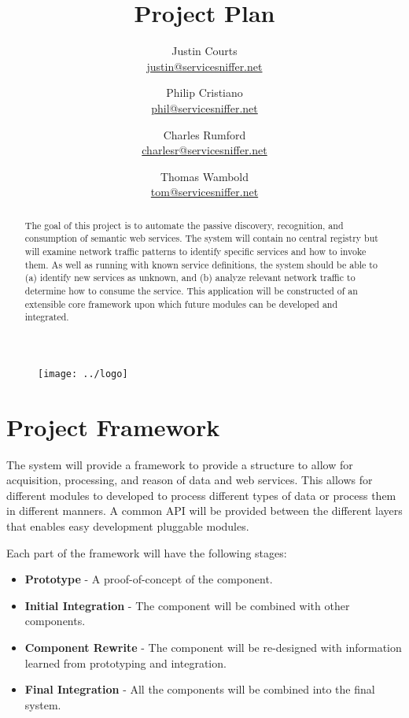 \documentclass{article}
\title{\textbf{Project Plan}}
\author{
    Justin Courts \\\url{justin@servicesniffer.net}
    \and Philip Cristiano \\\url{phil@servicesniffer.net}
    \and Charles Rumford \\\url{charlesr@servicesniffer.net}
    \and Thomas Wambold \\\url{tom@servicesniffer.net}
}
\date{\mydate}
\begin{document}
\begin{figure}
    \vspace{-6em}
    \centering
    \texttt{[image: ../logo]}
    \vspace{-4em}
\end{figure}
\maketitle

\begin{abstract}
The goal of this project is to automate the passive discovery, recognition, and
consumption of semantic web services.  The system will contain no central
registry but will examine network traffic patterns to identify specific
services and how to invoke them.  As well as running with known service
definitions, the system should be able to (a) identify new services as unknown,
and (b) analyze relevant network traffic to determine how to consume the
service.  This application will be constructed of an extensible core framework
upon which future modules can be developed and integrated.
\end{abstract}

\section{Project Framework}

The system will provide a framework to provide a structure to allow for
acquisition, processing, and reason of data and web services. This allows for
different modules to developed to process different types of data or process
them in different manners.  A common API will be provided between the
different layers that enables easy development pluggable modules.

Each part of the framework will have the following stages:
\begin{itemize}
    \item \textbf{Prototype} - A proof-of-concept of the component.
    \item \textbf{Initial Integration} - The component will be combined with
        other components.
    \item \textbf{Component Rewrite} - The component will be re-designed with
        information learned from prototyping and integration.
    \item \textbf{Final Integration} - All the components will be combined into
        the final system.
\end{itemize}
\end{document}
